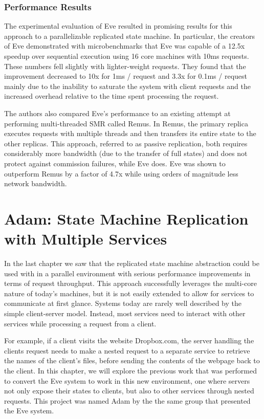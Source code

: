 \documentclass[11pt, oneside]{report}
\begin{document}
\subsection{Performance Results}

The experimental evaluation of Eve resulted in promising results for this approach to a parallelizable replicated state machine. In particular, the creators of Eve demonstrated with microbenchmarks that Eve was capable of a 12.5x speedup over sequential execution using 16 core machines with 10ms requests. These numbers fell slightly with lighter-weight requests. They found that the improvement decreased to 10x for 1ms / request and 3.3x for 0.1ms / request mainly due to the inability to saturate the system with client requests and the increased overhead relative to the time spent processing the request.

The authors also compared Eve's performance to an existing attempt at performing multi-threaded SMR called Remus. In Remus, the primary replica executes requests with multiple threads and then transfers its entire state to the other replicas. This approach, referred to as passive replication, both requires considerably more bandwidth (due to the transfer of full states) and does not protect against commission failures, while Eve does. Eve was shown to outperform Remus by a factor of 4.7x while using orders of magnitude less network bandwidth.

\chapter{Adam: State Machine Replication with Multiple Services}

In the last chapter we saw that the replicated state machine abstraction could be used with in a parallel environment with serious performance improvements in terms of request throughput. This approach successfully leverages the multi-core nature of today's machines, but it is not easily extended to allow for services to communicate at first glance. Systems today are rarely well described by the simple client-server model. Instead, most services need to interact with other services while processing a request from a client. 

For example, if a client visits the website Dropbox.com, the server handling the clients request needs to make a nested request to a separate service to retrieve the names of the client's files, before sending the contents of the webpage back to the client. In this chapter, we will explore the previous work that was performed to convert the Eve system to work in this new environment, one where servers not only expose their states to clients, but also to other services through nested requests. This project was named Adam by the the same group that presented the Eve system.
\end{document}
